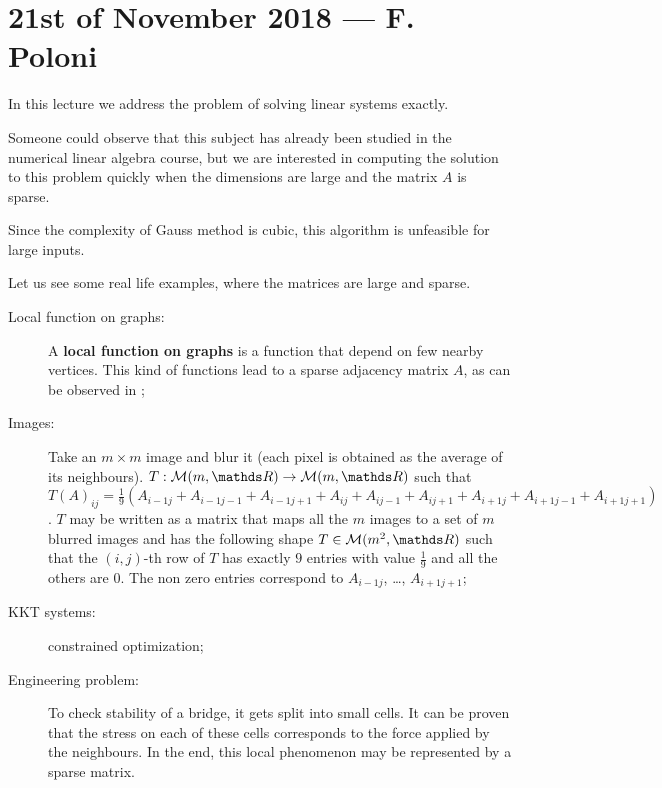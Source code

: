\documentclass[computational_mathematics.tex]{subfiles}
\begin{document}
\section{21st of November 2018 --- F. Poloni}

In this lecture we address the problem of solving linear systems exactly.

Someone could observe that this subject has already been studied in the numerical linear algebra course, but we are interested in computing the solution  to this problem quickly when the dimensions are large and the matrix $A$ is sparse.

Since the complexity of Gauss method is cubic, this algorithm is unfeasible for large inputs.

Let us see some real life examples, where the matrices are large and sparse.

\begin{description}
  \item[{\sc Local function on graphs:}] A \textbf{local function on graphs} is a function that depend on few nearby vertices.
    This kind of functions lead to a sparse adjacency matrix $A$, as can be observed in ;

  \item[{\sc Images:}] Take an $m \times m$ image and blur it (each pixel is obtained as the average of its neighbours). $T: \mathcal{M}(m, \R) \to \mathcal{M}(m, \R)$ such that ${T(A)}_{ij} = \frac{1}{9} (A_{i-1 j} + A_{i-1 j-1} + A_{i-1 j+1} + A_{i j} + A_{i j-1} + A_{i j+1} + A_{i+1 j} + A_{i+1 j-1} + A_{i+1 j+1})$. $T$ may be written as a matrix that maps all the $m$ images to a set of $m$ blurred images and has the following shape $T \in \mathcal{M}(m^2, \R)$ such that the $(i, j)$-th row of $T$ has exactly $9$ entries with value $\frac{1}{9}$ and all the others are $0$. The non zero entries correspond to $A_{i-1 j}$, \ldots, $A_{i+1 j+1}$;
  \item[{\sc KKT systems:}] constrained optimization;
  \item[{\sc Engineering problem:}] To check stability of a bridge, it gets split into small cells. It can be proven that the stress on each of these cells corresponds to the force applied by the neighbours. In the end, this local phenomenon may be represented by a sparse matrix.
\end{description}
\end{document}
